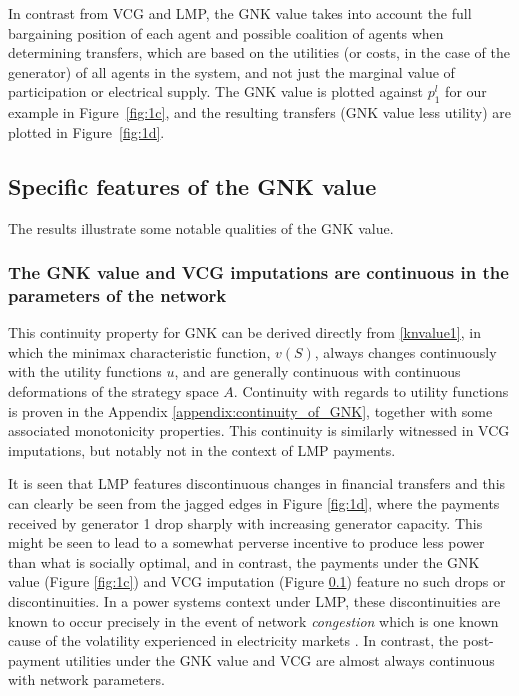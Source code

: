 In contrast from VCG and LMP, the GNK value takes into account the full bargaining position of each agent and possible coalition of agents when determining transfers, which are based on the utilities (or costs, in the case of the generator) of all agents in the system, and not just the marginal value of participation or electrical supply.
The GNK value is plotted against $p_1^l$ for our example in Figure~\ref{fig:1c}, and the resulting transfers (GNK value less utility) are plotted in Figure~\ref{fig:1d}.

\subsection{Specific features of the GNK value}
The results illustrate some notable qualities of the GNK value.


\subsubsection*{The GNK value and VCG imputations are continuous in the parameters of the network}
This continuity property for GNK can be derived directly from \eqref{knvalue1}, in which the minimax characteristic function, $v(S)$,
always changes continuously with the utility functions $u$, and are generally continuous with continuous deformations of the strategy space $A$.
Continuity with regards to utility functions is proven in the Appendix \ref{appendix:continuity_of_GNK}, together with some associated monotonicity properties.
This continuity is similarly witnessed in VCG imputations, but notably not in the context of LMP payments.

It is seen that LMP features discontinuous changes in financial transfers and this can clearly be seen from the jagged edges in Figure \ref{fig:1d}, where the payments received by generator 1 drop sharply with increasing generator capacity.
This might be seen to lead to a somewhat perverse incentive to produce less power than what is socially optimal, and in contrast, the payments under the GNK value (Figure \ref{fig:1c}) and VCG imputation (Figure \ref{}) feature no such drops or discontinuities.
In a power systems context under LMP, these discontinuities are known to occur precisely in the event of network \emph{congestion}
which is one known cause of the volatility experienced in
electricity markets \cite{RePEc:aen:journl:2006v27-02-a09}. 
In contrast, the post-payment utilities under the GNK value and VCG are almost always continuous with network parameters.


